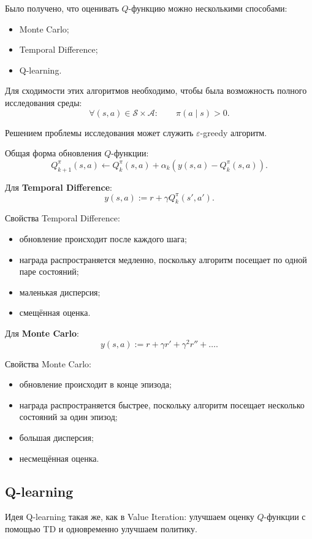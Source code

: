 \documentclass[12pt,a4paper]{article}
\begin{document}
Было получено, что оценивать $Q$-функцию можно несколькими способами:
\begin{itemize}
    \item Monte Carlo;
    \item Temporal Difference;
    \item Q-learning.
\end{itemize}

Для сходимости этих алгоритмов необходимо, чтобы была возможность полного исследования среды:
\[
\forall (s,a) \in \mathcal S \times \mathcal A:
\qquad
\pi(a\mid s)>0.
\]

Решением проблемы исследования может служить $\varepsilon$-greedy алгоритм.

Общая форма обновления $Q$-функции:
\[
Q_{k+1}^{\pi}(s,a)
\leftarrow
Q_k^{\pi}(s,a)
+
\alpha_k
\left(
y(s,a)-Q_k^{\pi}(s,a)
\right).
\]

Для \textbf{Temporal Difference}:
\[
y(s,a)
:=
r+\gamma Q_k^\pi(s',a').
\]

Свойства Temporal Difference:
\begin{itemize}
    \item обновление происходит после каждого шага;
    \item награда распространяется медленно, поскольку алгоритм посещает по одной паре состояний;
    \item маленькая дисперсия;
    \item смещённая оценка.
\end{itemize}

Для \textbf{Monte Carlo}:
\[
y(s,a)
:=
r+\gamma r'
+
\gamma^2 r''
+
\ldots.
\]

Свойства Monte Carlo:
\begin{itemize}
    \item обновление происходит в конце эпизода;
    \item награда распространяется быстрее, поскольку алгоритм посещает несколько состояний за один эпизод;
    \item большая дисперсия;
    \item несмещённая оценка.
\end{itemize}

\subsection{Q-learning}

Идея Q-learning такая же, как в Value Iteration: улучшаем оценку $Q$-функции с помощью TD и одновременно улучшаем политику.
\end{document}
